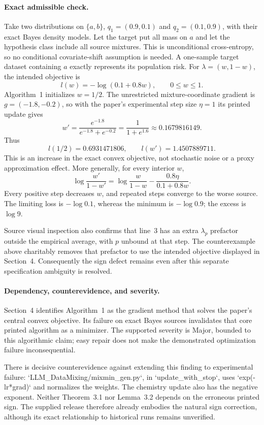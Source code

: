 \documentclass[10pt]{article}
\begin{document}
\paragraph*{Exact admissible check.}\mbox{}\par
Take two distributions on \(\{a,b\}\), \(q_1=(0.9,0.1)\) and \(q_2=(0.1,0.9)\), with their exact Bayes density models. Let the target put all mass on \(a\) and let the hypothesis class include all source mixtures. This is unconditional cross-entropy, so no conditional covariate-shift assumption is needed. A one-sample target dataset containing \(a\) exactly represents its population risk. For \(\lambda=(w,1-w)\), the intended objective is \[l(w)=-\log(0.1+0.8w),\qquad 0\le w\le1.\] Algorithm 1 initializes \(w=1/2\). The unrestricted mixture-coordinate gradient is \(g=(-1.8,-0.2)\), so with the paper’s experimental step size \(\eta=1\) its printed update gives \[w'=\frac{e^{-1.8}}{e^{-1.8}+e^{-0.2}}
 =\frac{1}{1+e^{1.6}}\approx0.1679816149.\] Thus \[l(1/2)=0.6931471806,\qquad l(w')=1.4507889711.\] This is an increase in the exact convex objective, not stochastic noise or a proxy approximation effect. More generally, for every interior \(w\), \[\log\frac{w'}{1-w'}=
 \log\frac{w}{1-w}-\frac{0.8\eta}{0.1+0.8w}.\] Every positive step decreases \(w\), and repeated steps converge to the worse source. The limiting loss is \(-\log0.1\), whereas the minimum is \(-\log0.9\); the excess is \(\log9\).\par
Source visual inspection also confirms that line 3 has an extra \(\lambda_p\) prefactor outside the empirical average, with \(p\) unbound at that step. The counterexample above charitably removes that prefactor to use the intended objective displayed in Section 4. Consequently the sign defect remains even after this separate specification ambiguity is resolved.\par
\paragraph*{Dependency, counterevidence, and severity.}\mbox{}\par
Section 4 identifies Algorithm 1 as the gradient method that solves the paper’s central convex objective. Its failure on exact Bayes sources invalidates that core printed algorithm as a minimizer. The supported severity is Major, bounded to this algorithmic claim; easy repair does not make the demonstrated optimization failure inconsequential.\par
There is decisive counterevidence against extending this finding to experimental failure: `LLM\_DataMixing/mixmin\_gen.py`, in `update\_with\_stop`, uses `exp(-lr*grad)` and normalizes the weights. The chemistry update also has the negative exponent. Neither Theorem 3.1 nor Lemma 3.2 depends on the erroneous printed sign. The supplied release therefore already embodies the natural sign correction, although its exact relationship to historical runs remains unverified.\par
\end{document}
